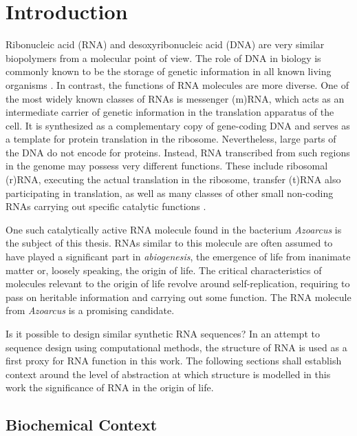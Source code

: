 \documentclass[../../master.tex]{subfiles}
\begin{document}
\section{Introduction}
\label{sec:intro}

Ribonucleic acid (RNA) and desoxyribonucleic acid (DNA) are very similar biopolymers from a molecular point of view.
The role of DNA in biology is commonly known to be the storage of genetic information in all known living organisms \parencite{lodish_molecular_2000}.
In contrast, the functions of RNA molecules are more diverse.
One of the most widely known classes of RNAs is messenger (m)RNA, which acts as an intermediate carrier of genetic information in the translation apparatus of the cell. 
It is synthesized as a complementary copy of gene-coding DNA and serves as a template for protein translation in the ribosome.
Nevertheless, large parts of the DNA do not encode for proteins.
Instead, RNA transcribed from such regions in the genome may possess very different functions.
These include ribosomal (r)RNA, executing the actual translation in the ribosome, transfer (t)RNA also participating in translation, as well as many classes of other small non-coding RNAs carrying out specific catalytic functions \parencite{hofacker_rna_2006}.

One such catalytically active RNA molecule found in the bacterium \textit{Azoarcus} is the subject of this thesis.
RNAs similar to this molecule are often assumed to have played a significant part in \emph{abiogenesis}, the emergence of life from inanimate matter or, loosely speaking, the origin of life.
The critical characteristics of molecules relevant to the origin of life revolve around self-replication, requiring to pass on heritable information and carrying out some function.
The RNA molecule from \textit{Azoarcus} is a promising candidate.

Is it possible to design similar synthetic RNA sequences?
In an attempt to sequence design using computational methods, the structure of RNA is used as a first proxy for RNA function in this work.
The following sections shall establish context around the level of abstraction at which structure is modelled in this work the significance of RNA in the origin of life.


\subsection{Biochemical Context}
\label{sub:intro:rnas}
\end{document}
